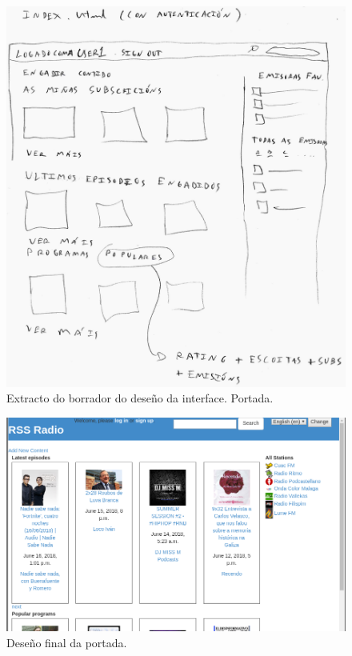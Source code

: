 \begin{figure}[H]
	\centering
	\includegraphics[scale=0.2,keepaspectratio=true]{./images/index1_p.png}
	\caption{Extracto do borrador do deseño da interface. Portada.}
	\label{fig:index1_p}
\end{figure}


\begin{figure}[h]
	\centering
	\includegraphics[scale=0.44,keepaspectratio=true]{./images/responsive1.png}
	\caption{Deseño final da portada.}
	\label{fig:responsive1}
\end{figure}


